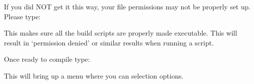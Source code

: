 \documentclass[letterpaper,10pt,english]{sphinxmanual}
\begin{document}
\sphinxAtStartPar
If you did NOT get it this way, your file permissions may not be properly set up.  Please type:

\begin{sphinxVerbatim}[commandchars=\\\{\}]
      
\end{sphinxVerbatim}

\sphinxAtStartPar
This makes sure all the build scripts are properly made executable.
This will result in ‘permission denied’ or similar results when running a script.

\sphinxAtStartPar
Once ready to compile type:

\begin{sphinxVerbatim}[commandchars=\\\{\}]
 
\end{sphinxVerbatim}

\sphinxAtStartPar
This will bring up a menu where you can selection options.
\end{document}
